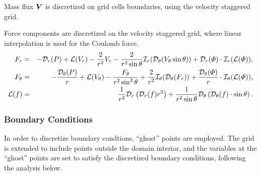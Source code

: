 Mass flux $\boldsymbol{V}$ is discretized on grid cells boundaries, 
using the velocity staggered grid.

Force components are discretized on the velocity staggered grid, where
linear interpolation is used for the Coulomb force.
\begin{eqnarray}
F_r &=& -\mathcal{D}_r(P) 
          + \mathcal{L}(V_r) - \frac{2}{r^2} V_r 
		  - \frac{2}{r^2 \sin\theta} \mathcal{I}_r(\mathcal{D}_\theta (V_\theta \sin\theta))
          + \mathcal{D}_r(\varPhi) \cdot \mathcal{I}_r(\mathcal{L}(\varPhi)), \\
F_\theta &=& -\frac{\mathcal{D}_\theta(P)}{r} 
		  + \mathcal{L}(V_\theta) - \frac{F_\theta}{r^2 \sin^2\theta} 
		  + \frac{2}{r^2} \mathcal{I}_\theta(\mathcal{D}_\theta(F_r))
		  + \frac{\mathcal{D}_\theta(\varPhi)}{r} \cdot \mathcal{I}_\theta(\mathcal{L}(\varPhi)), \\
\mathcal{L}(f) &=& \frac{1}{r^2}\mathcal{D}_r\left(\mathcal{D}_r(f) r^2\right) + 
\frac{1}{r^2 \sin\theta} \mathcal{D}_\theta\left(\mathcal{D}_\theta(f) \cdot \sin\theta\right).
\end{eqnarray}


\subsubsection{Boundary Conditions}
In order to discretize boundary condtions, 
``ghost'' points are employed. 
The grid is extended to include points outside the domain interior,
and the variables at the ``ghost'' points are set to satisfy 
the discretized boundary conditions, following the analysis below.

